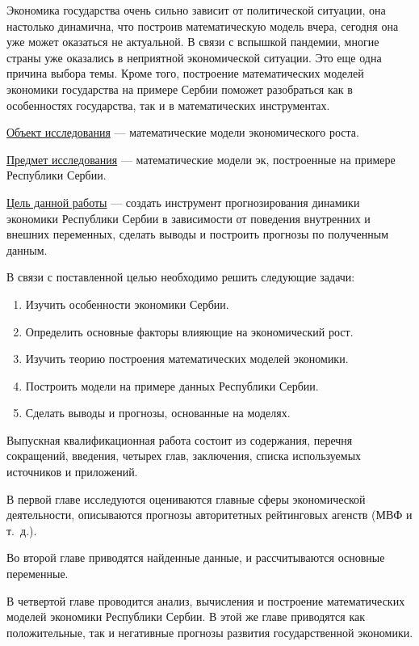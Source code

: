 Экономика государства очень сильно зависит от политической ситуации, она настолько динамична, что построив математическую модель вчера, сегодня она уже может оказаться не актуальной. В связи с вспышкой пандемии, многие страны уже оказались в неприятной экономической ситуации.
Это еще одна причина выбора темы.
Кроме того, построение математических моделей экономики государства на примере Сербии поможет разобраться как в особенностях государства, так и в математических инструментах.

\underline{Объект исследования} --- математические модели экономического роста.

\underline{Предмет исследования} --- математические модели эк, построенные на примере Республики Сербии.

\underline{Цель данной работы} --- создать инструмент прогнозирования динамики экономики Республики Сербии в зависимости от поведения внутренних и внешних переменных, сделать выводы и построить прогнозы по полученным данным.

В связи с поставленной целью необходимо решить следующие задачи:
\begin{enumerate}
	\item Изучить особенности экономики Сербии.
	\item Определить основные факторы влияющие на экономический рост.
	\item Изучить теорию построения математических моделей экономики.
	\item Построить модели на примере данных Республики Сербии.
	\item Сделать выводы и прогнозы, основанные на моделях.
\end{enumerate}

Выпускная квалификационная работа состоит из содержания, перечня сокращений, введения, четырех глав, заключения, списка используемых источников и приложений.

В первой главе исследуются оцениваются главные сферы экономической деятельности, описываются прогнозы авторитетных рейтинговых агенств (МВФ и т.~д.).

Во второй главе приводятся найденные данные, и рассчитываются основные переменные.

В четвертой главе проводится анализ, вычисления и построение математических моделей экономики Республики Сербии. В этой же главе приводятся как положительные, так и негативные прогнозы развития государственной экономики.

